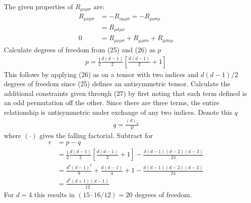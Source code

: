 \documentclass[10pt]{scrartcl}
\begin{document}
The given properties of $R_{\mu\nu\rho\sigma}$ are:
\begin{align}
R_{\mu\nu\rho\sigma} &= -R_{\nu\mu\rho\sigma} = -R_{\mu\nu\sigma\rho}	\\
&= R_{\rho\sigma\mu\nu}\\
0&=R_{\mu\nu\rho\sigma}+R_{\mu\rho\sigma\nu} + R_{\mu\sigma\nu\rho} 
\end{align}
Calculate degrees of freedom from (25) and (26) as $p$
\begin{align}
p=\frac{1}{2}\frac{d(d-1)}{2}\left[\frac{d(d-1)}{2}+1\right] 	
\end{align}
This follows by applying (26) as on a tensor with two indices and $d(d-1)/2$ degrees of freedom since (25) defines an antisymmetric tensor.  Calculate the additional constraints given through (27) by first noting that each term defined is an odd permutation off the other. Since there are three terms, the entire relationship is antisymmetric under exchange of any two indices. Denote this $q$
\begin{align}
q  = \frac{(d)_4}{4!}	
\end{align}
where $(\cdot)$ gives the falling factorial. 
Subtract for
\begin{align}
r &= p - q\\
&= 	\frac{1}{2}\frac{d(d-1)}{2}\left[\frac{d(d-1)}{2}+1\right] - \frac{d(d-1)(d-2)(d-3)}{24}\\
&= 	\frac{d^2(d-1)^2}{8}+\frac{d(d-1)}{4}+1 - \frac{d(d-1)(d-2)(d-3)}{24}\\
&= \frac{d^2(d+1)(d-1)}{12}
\end{align}
For $d=4$ this results in $(15\cdot 16/12) = 20$ degrees of freedom.
\end{document}
